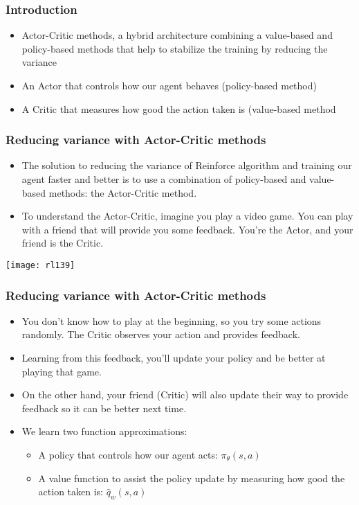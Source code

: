 \begin{frame}[fragile]\frametitle{Introduction}


\begin{itemize}
\item Actor-Critic methods, a hybrid architecture combining a value-based and policy-based methods that help to stabilize the training by reducing the variance
\item An Actor that controls how our agent behaves (policy-based method)
\item A Critic that measures how good the action taken is (value-based method
\end{itemize}


\end{frame}

\begin{frame}[fragile]\frametitle{Reducing variance with Actor-Critic methods}


\begin{itemize}
\item The solution to reducing the variance of Reinforce algorithm and training our agent faster and better is to use a combination of policy-based and value-based methods: the Actor-Critic method.
\item 
To understand the Actor-Critic, imagine you play a video game. You can play with a friend that will provide you some feedback. You're the Actor, and your friend is the Critic.
\end{itemize}

\begin{center}
\texttt{[image: rl139]}
\end{center}

\end{frame}

\begin{frame}[fragile]\frametitle{Reducing variance with Actor-Critic methods}
\begin{itemize}
\item You don't know how to play at the beginning, so you try some actions randomly. The Critic observes your action and provides feedback.
\item Learning from this feedback, you'll update your policy and be better at playing that game.
\item On the other hand, your friend (Critic) will also update their way to provide feedback so it can be better next time.
\item We learn two function approximations:
\begin{itemize}
\item A policy that controls how our agent acts: $\pi_{\theta}(s,a)$
\item A value function to assist the policy update by measuring how good the action taken is: $\hat{q}_{w}(s,a)$
\end{itemize}
\end{itemize}
\end{frame}


